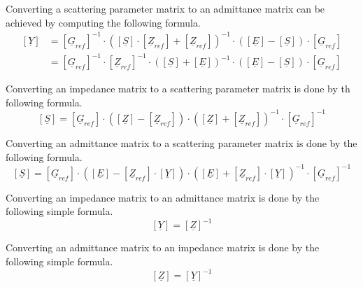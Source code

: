 Converting a scattering parameter matrix to an admittance matrix can
be achieved by computing the following formula.
\begin{align}
\left[
\underline{Y}
\right]
&=
\left[
\underline{G}_{ref}
\right]^{-1}
\cdot
\left(
\left[\underline{S}\right] \cdot \left[\underline{Z}_{ref}\right] + \left[\underline{Z}_{ref}\right]
\right)^{-1}
\cdot
\left(
\left[\underline{E}\right] - \left[\underline{S}\right]
\right)
\cdot
\left[\underline{G}_{ref}\right]\\
&=
\left[\underline{G}_{ref}\right]^{-1}
\cdot \left[\underline{Z}_{ref}\right]^{-1}
\cdot
\left(
\left[\underline{S}\right] + \left[\underline{E}\right]
\right)^{-1}
\cdot
\left(
\left[\underline{E}\right] - \left[\underline{S}\right]
\right)
\cdot
\left[\underline{G}_{ref}\right]
\end{align}

Converting an impedance matrix to a scattering parameter matrix is
done by th following formula.
\begin{equation}
\left[
\underline{S}
\right]
=
\left[
\underline{G}_{ref}
\right]
\cdot
\left(
\left[\underline{Z}\right] - \left[\underline{Z}_{ref}\right]
\right)
\cdot
\left(
\left[\underline{Z}\right] + \left[\underline{Z}_{ref}\right]
\right)^{-1}
\cdot
\left[\underline{G}_{ref}\right]^{-1}
\end{equation}

Converting an admittance matrix to a scattering parameter matrix is
done by the following formula.
\begin{equation}
\label{eqn:Y2S}
\left[
\underline{S}
\right]
=
\left[
\underline{G}_{ref}
\right]
\cdot
\left(
\left[\underline{E}\right] - \left[\underline{Z}_{ref}\right] \cdot \left[\underline{Y}\right]
\right)
\cdot
\left(
\left[\underline{E}\right] + \left[\underline{Z}_{ref}\right] \cdot \left[\underline{Y}\right]
\right)^{-1}
\cdot
\left[\underline{G}_{ref}\right]^{-1}
\end{equation}

Converting an impedance matrix to an admittance matrix is done by the
following simple formula.
\begin{equation}
\left[
\underline{Y}
\right]
=
\left[
\underline{Z}
\right]^{-1}
\end{equation}

Converting an admittance matrix to an impedance matrix is done by the
following simple formula.
\begin{equation}
\left[
\underline{Z}
\right]
=
\left[
\underline{Y}
\right]^{-1}
\end{equation}

